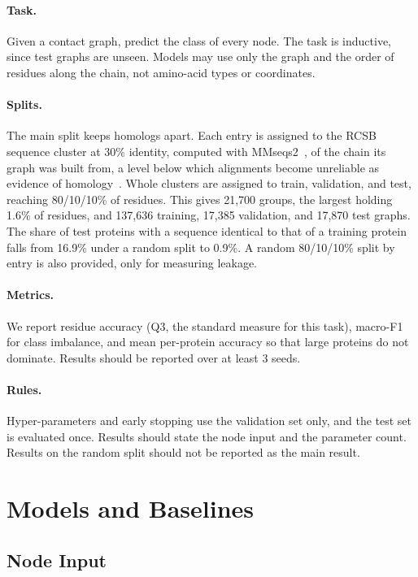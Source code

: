 \documentclass[pdflatex,sn-mathphys-num]{sn-jnl}
\begin{document}
\paragraph{Task.} Given a contact graph, predict the class of every node. The task is inductive, since test graphs are unseen. Models may use only the graph and the order of residues along the chain, not amino-acid types or coordinates.

\paragraph{Splits.} The main split keeps homologs apart. Each entry is assigned to the RCSB sequence cluster at 30\% identity, computed with MMseqs2~\cite{steinegger2017mmseqs2}, of the chain its graph was built from, a level below which alignments become unreliable as evidence of homology~\cite{rost1999twilight}. Whole clusters are assigned to train, validation, and test, reaching 80/10/10\% of residues. This gives 21,700 groups, the largest holding 1.6\% of residues, and 137,636 training, 17,385 validation, and 17,870 test graphs. The share of test proteins with a sequence identical to that of a training protein falls from 16.9\% under a random split to 0.9\%. A random 80/10/10\% split by entry is also provided, only for measuring leakage.

\paragraph{Metrics.} We report residue accuracy (Q3, the standard measure for this task), macro-F1 for class imbalance, and mean per-protein accuracy so that large proteins do not dominate. Results should be reported over at least 3 seeds.

\paragraph{Rules.} Hyper-parameters and early stopping use the validation set only, and the test set is evaluated once. Results should state the node input and the parameter count. Results on the random split should not be reported as the main result.

\section{Models and Baselines}\label{sec:models}

\subsection{Node Input}\label{sec:input}
\end{document}
